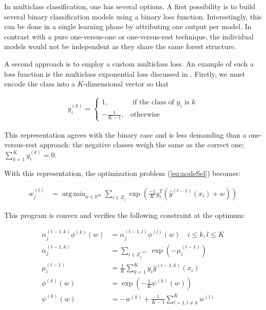 \documentclass{article}
\DeclareMathOperator*{\argmin}{arg\,min}
\begin{document}
In multiclass classification, one has several options. A first possibility is 
to build several binary classification models using a binary loss function. 
Interestingly, this can be done in a single learning phase by attributing one 
output per model. In contrast with a pure one-versus-one or one-versus-rest 
technique, the individual models would not be independent as they share the 
same forest structure.

A second approach is to employ a custom multiclass loss. An example of such a 
loss function is the multiclass exponential loss discussed in 
\citet{zhu2009multiadaboost}. Firstly, we must encode the class into a 
$K$-dimensional vector so that


\begin{align}\label{eq:MEencode}
y_i^{(k)} = \begin{cases}
1, &\text{ if the class of } y_i \text{ is } k \\
-\frac{1}{K-1}, &\text{otherwise}
\end{cases}
\end{align}

This representation agrees with the binary case and is less demanding than a 
one-versus-rest approach: the negative classes weigh the same as the correct 
one; $\sum_{k=1}^{K} y_i^{(k)} = 0$.

With this representation, the optimization problem (\ref{eq:nodeSel}) becomes:

\begin{align}\label{eq:MEmin}
w_j^{(t)} &=  \argmin_{w \in \mathbb{R}^K} \sum_{i \in Z_j} \exp 
\left(\frac{-1}{K} y_i^T \left(\hat{y}^{(t-1)}(x_i) + w \right)\right)
\end{align}

This program is convex and verifies the following constraint at the optimum:

\begin{align}\label{eq:MEequation}
\alpha_j^{(t-1, k)}\phi^{(k)}(w) &= \alpha_j^{(t-1, l)}\phi^{(l)}(w) \quad i 
\leq k,l \leq K \\
\alpha_j^{(t-1, k)} &= \sum_{i \in Z_j^{(k)}} \exp \left( - \mu_i^{(t-1)} 
\right) \\
\mu_i^{(t-1)} &= \frac{1}{K} \sum_{k=1}^{K} y_i \hat{y}^{(t-1, k)}(x_i) \\
\phi^{(k)}(w) &= \exp \left( - \frac{1}{K} \psi^{(k)}(w) \right) \\
\psi^{(k)}(w) &= -w^{(k)} + \frac{1}{K-1} \sum_{l=1, l\neq k}^{K}  w^{(l)}
\end{align}
\end{document}

